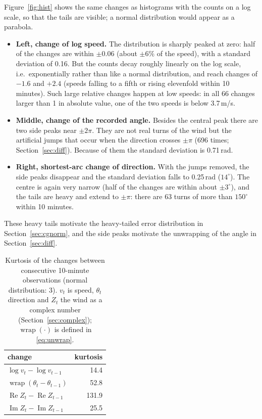 \documentclass[11pt,a4paper]{article}
\DeclareMathOperator{\wrap}{wrap}
\newcommand{\1}{\mathbf{1}}
\renewcommand{\Re}{\operatorname{Re}}
\renewcommand{\Im}{\operatorname{Im}}
\begin{document}
Figure~\ref{fig:hist} shows the same changes as histograms with the counts on a log scale, so that
the tails are visible; a normal distribution would appear as a parabola.
\begin{itemize}
  \item \textbf{Left, change of log speed.} The distribution is sharply peaked at zero: half of the
    changes are within $\pm 0.06$ (about $\pm 6\%$ of the speed), with a standard deviation of
    0.16. But the counts decay roughly linearly on the log scale, i.e.\ exponentially rather than
    like a normal distribution, and reach changes of $-1.6$ and $+2.4$ (speeds falling to a fifth or
    rising elevenfold within 10 minutes). Such large relative changes happen at low speeds: in all 66
changes larger than 1 in absolute value, one of the two speeds is below 3.7\,m/s.
  \item \textbf{Middle, change of the recorded angle.} Besides the central peak there are two side
    peaks near $\pm 2\pi$. They are not real turns of the wind but the artificial jumps that occur
    when the direction crosses $\pm\pi$ (696 times; Section~\ref{sec:diff}). Because of them the
    standard deviation is 0.71\,rad.
  \item \textbf{Right, shortest-arc change of direction.} With the jumps removed, the side peaks
    disappear and the standard deviation falls to 0.25\,rad ($14^\circ$). The centre is again very
    narrow (half of the changes are within about $\pm 3^\circ$), and the tails are heavy and extend
    to $\pm\pi$: there are 63 turns of more than $150^\circ$ within 10 minutes.
\end{itemize}
These heavy tails motivate the heavy-tailed error distribution in
Section~\ref{sec:cgnorm}, and the side peaks motivate the unwrapping of the angle in
Section~\ref{sec:diff}.

\begin{table}[H]
  \centering
  \caption{Kurtosis of the changes between consecutive 10-minute observations (normal
    distribution: 3). $v_t$ is speed, $\theta_t$ direction and $Z_t$ the wind as a complex number
    (Section~\ref{sec:complex}); $\wrap(\cdot)$ is defined in \eqref{eq:unwrap}.}\label{tab:kurt}
  \begin{tabular}{lr}
    \toprule
    change & kurtosis \\
    \midrule
    $\log v_t - \log v_{t-1}$ & 14.4 \\
    $\wrap(\theta_t - \theta_{t-1})$ & 52.8 \\
    $\Re Z_t - \Re Z_{t-1}$ & 131.9 \\
    $\Im Z_t - \Im Z_{t-1}$ & 25.5 \\
    \bottomrule
  \end{tabular}
\end{table}
\end{document}
